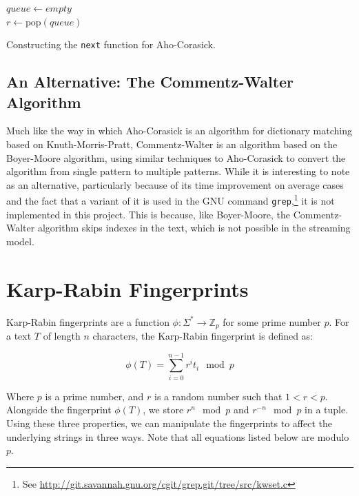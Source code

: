 \documentclass[ %
                    author={Dominic Joseph Moylett},
                    degree={MEng},
                     title={Dictionary Matching with Fingerprints},
                  subtitle={An Empirical Analysis},
                      type={research},
                      year={2015} ]{dissertation}
\begin{document}
\begin{algorithm}[t]
$queue \gets empty$\\
 {
  $r \gets \text{pop}(queue)$\\
}
\caption{Constructing the \texttt{next} function for Aho-Corasick.}
\label{alg:ac-next}
\end{algorithm}

\subsection{An Alternative: The Commentz-Walter Algorithm}

Much like the way in which Aho-Corasick is an algorithm for dictionary matching based on Knuth-Morris-Pratt, Commentz-Walter\cite{commentz-walter:algo} is an algorithm based on the Boyer-Moore algorithm\cite{Boyer:1977:FSS:359842.359859}, using similar techniques to Aho-Corasick to convert the algorithm from single pattern to multiple patterns. While it is interesting to note as an alternative, particularly because of its time improvement on average cases and the fact that a variant of it is used in the GNU command \texttt{grep},\footnote{See \url{http://git.savannah.gnu.org/cgit/grep.git/tree/src/kwset.c}} it is not implemented in this project. This is because, like Boyer-Moore, the Commentz-Walter algorithm skips indexes in the text, which is not possible in the streaming model.

\section{Karp-Rabin Fingerprints}
\label{sec:kr-fingerprints}

Karp-Rabin fingerprints\cite{5390135} are a function $\phi : \Sigma^* \to \mathbb{Z}_p$ for some prime number $p$. For a text $T$ of length $n$ characters, the Karp-Rabin fingerprint is defined as:

$$\phi(T) = \sum_{i = 0}^{n - 1} r^it_i \mod p$$

Where $p$ is a prime number, and $r$ is a random number such that $1 < r < p$. Alongside the fingerprint $\phi(T)$, we store $r^n \mod p$ and $r^{-n} \mod p$ in a tuple. Using these three properties, we can manipulate the fingerprints to affect the underlying strings in three ways\cite{5438620}. Note that all equations listed below are modulo $p$.
\end{document}
